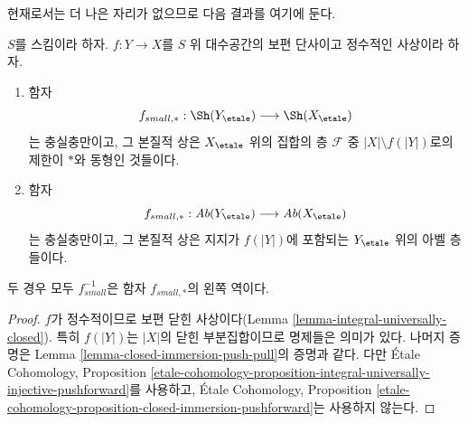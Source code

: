 \noindent
현재로서는 더 나은 자리가 없으므로 다음 결과를 여기에 둔다.

\begin{lemma}
\label{lemma-integral-universally-injective-push-pull}
$S$를 스킴이라 하자. $f : Y \to X$를 $S$ 위 대수공간의 보편 단사이고
정수적인 사상이라 하자.
\begin{enumerate}
\item 함자
$$
f_{small, *} : \Sh(Y_\etale) \longrightarrow \Sh(X_\etale)
$$
는 충실충만이고, 그 본질적 상은 $X_\etale$ 위의 집합의 층
$\mathcal{F}$ 중 $|X| \setminus f(|Y|)$로의 제한이 $*$와 동형인
것들이다.
\item 함자
$$
f_{small, *} : \textit{Ab}(Y_\etale) \longrightarrow \textit{Ab}(X_\etale)
$$
는 충실충만이고, 그 본질적 상은 지지가 $f(|Y|)$에 포함되는
$Y_\etale$ 위의 아벨 층들이다.
\end{enumerate}
두 경우 모두 $f_{small}^{-1}$은 함자 $f_{small, *}$의 왼쪽 역이다.
\end{lemma}

\begin{proof}
$f$가 정수적이므로 보편 닫힌 사상이다(Lemma
\ref{lemma-integral-universally-closed}). 특히 $f(|Y|)$는 $|X|$의
닫힌 부분집합이므로 명제들은 의미가 있다. 나머지 증명은 Lemma
\ref{lemma-closed-immersion-push-pull}의 증명과 같다. 다만
\'Etale Cohomology, Proposition
\ref{etale-cohomology-proposition-integral-universally-injective-pushforward}를
사용하고, \'Etale Cohomology, Proposition
\ref{etale-cohomology-proposition-closed-immersion-pushforward}는
사용하지 않는다.
\end{proof}













